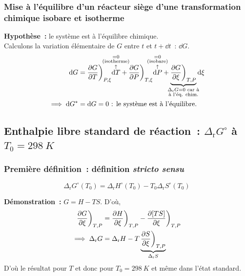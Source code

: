 \documentclass{article}
\newcommand{\ds}{\displaystyle}
\newcommand{\Dr}{\Delta_{\mathrm{r}}}
\newcommand{\Tz}{T_0 = \SI{298}{K}}
\begin{document}
\subsubsection{Mise à l'équilibre d'un réacteur siège d'une transformation chimique isobare et isotherme}
\begin{tableau}
    \textbf{Hypothèse~:} le système est à l'équilibre chimique.\\
    Calculons la variation élémentaire de $G$ entre $t$ et $t+\dd{t}$~: $\dd{G}$.
    \begin{align*}
        \dd{G} &= \pdv{G}{T}\bigg)_{P,\xi}\overset{\mathclap{\substack{=0\\\text{(isotherme)}\\\uparrow}}}{\dd{T}} + \pdv{G}{P}\bigg)_{T,\xi}\overset{\mathclap{\substack{=0\\\text{(isobare)}\\\uparrow}}}{\dd{P}} + \underbrace{\pdv{G}{\xi}\bigg)_{T,P}}_{\mathclap{\substack{\Dr G = 0 \text{ car à}\\\text{à l'éq. chim.}}}}\dd{\xi}\\
        \implies \dd{G^*} &= \dd{G} = 0\text{~: le système est à l'équilibre.}
    \end{align*}
\end{tableau}
\subsection{Enthalpie libre standard de réaction~: $\Dr G^\circ$ à $\Tz$}
\subsubsection{Première définition~: définition \textit{stricto sensu}}
\begin{tableau}
    \begin{enonce}
        \begin{equation}\label{2}
            \Dr G^\circ(T_0) = \Dr H^\circ (T_0) - T_0\Dr S^\circ(T_0)
        \end{equation}
        
    \end{enonce}
    \tcbline
    \textbf{Démonstration~:} $G = H-TS$. D'où,
    \begin{align*}
        \ds\pdv{G}{\xi}\bigg)_{T,P} &= \pdv{H}{\xi}\bigg)_{T,P} - \pdv{[TS]}{\xi}\bigg)_{T,P}\\
        \implies \Dr G &= \Dr H - T\underbrace{\pdv{S}{\xi}\bigg)_{T,P}}_{\Dr S}
    \end{align*}
    D'où le résultat pour $T$ et donc pour $\Tz$ et même dans l'état standard.
\end{tableau}
\end{document}
